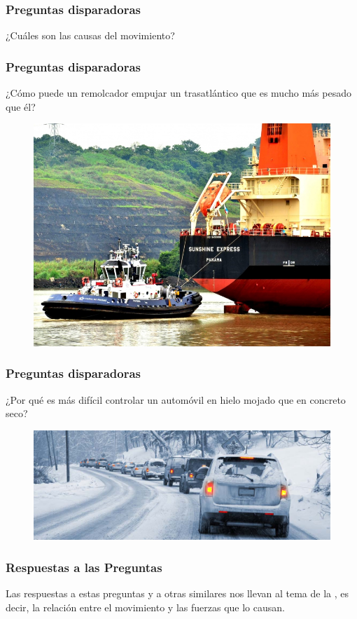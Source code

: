 \documentclass[14pt]{beamer}
\begin{document}
\begin{frame}
\frametitle{Preguntas disparadoras}
¿Cuáles son las causas del movimiento? 
\end{frame}
\begin{frame}
\frametitle{Preguntas disparadoras}
¿Cómo puede un remolcador empujar un trasatlántico que es mucho más pesado que él?
\pause
\begin{figure}
    \centering
    \includegraphics[scale=0.2]{Imagenes/Fuerza_10.jpg}
\end{figure}
\end{frame}
\begin{frame}
\frametitle{Preguntas disparadoras}
¿Por qué es más difícil controlar un automóvil en hielo mojado que en concreto seco?
\begin{figure}
    \centering
    \includegraphics[scale=0.2]{Imagenes/Fuerza_11.jpg}
\end{figure}
\end{frame}
\begin{frame}
\frametitle{Respuestas a las Preguntas}
Las respuestas a estas preguntas y a otras similares nos llevan al tema de la , \pause es decir, la relación entre el movimiento y las fuerzas que lo causan.
\end{frame}
\end{document}
